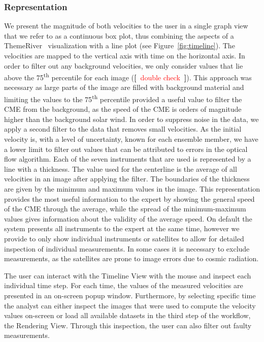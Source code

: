 \documentclass[journal]{vgtc}                %
\newcommand{\todo}[1] {\textbf{[~}\textcolor {red}{#1}\marginpar{\textcolor {red}{\centerline{{\Huge \textbf{!}}}}}\textbf{~]}}
\newcommand{\todo}[1] {\textbf{[~}\textcolor {red}{#1}\marginpar{\textcolor {red}{\centerline{{\Huge \textbf{!}}}}}\textbf{~]}}
\begin{document}
\subsubsection{Representation} \label{sec:representation}
We present the magnitude of both velocities to the user in a single graph view that we refer to as a continuous box plot, thus combining the aspects of a ThemeRiver~\cite{havre2002themeriver} visualization with a line plot (see Figure~\ref{fig:timeline}). The velocities are mapped to the vertical axis with time on the horizontal axis. In order to filter out any background velocities, we only consider values that lie above the 75\textsuperscript{th} percentile for each image (\todo{double check}). This approach was necessary as large parts of the image are filled with background material and limiting the values to the 75\textsuperscript{th} percentile provided a useful value to filter the CME from the background, as the speed of the CME is orders of magnitude higher than the background solar wind. In order to suppress noise in the data, we apply a second filter to the data that removes small velocities. As the initial velocity is, with a level of uncertainty, known for each ensemble member, we have a lower limit to filter out values that can be attributed to errors in the optical flow algorithm. Each of the seven instruments that are used is represented by a line with a thickness. The value used for the centerline is the average of all velocities in an image after applying the filter. The boundaries of the thickness are given by the minimum and maximum values in the image. This representation provides the most useful information to the expert by showing the general speed of the CME through the average, while the spread of the minimum-maximum values gives information about the validity of the average speed. On default the system presents all instruments to the expert at the same time, however we provide to only show individual instruments or satellites to allow for detailed inspection of individual measurements. In some cases it is necessary to exclude measurements, as the satellites are prone to image errors due to cosmic radiation. 

The user can interact with the Timeline View with the mouse and inspect each individual time step. For each time, the values of the measured velocities are presented in an on-screen popup window. Furthermore, by selecting specific time the analyst can either inspect the images that were used to compute the velocity values on-screen or load all available datasets in the third step of the workflow, the Rendering View. Through this inspection, the user can also filter out faulty measurements.
\end{document}
